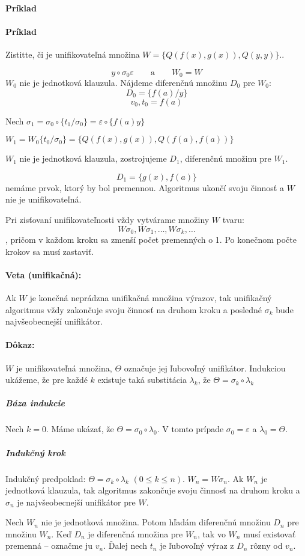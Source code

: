 \paragraph{Príklad}

\paragraph{Príklad} Zistitte, či je unifikovateľná množina $W=\{Q(f(x),g(x)),
Q(y,y)\}..$


	$$y\circ \sigma_0 \varepsilon \qquad \mbox{a} \qquad W_0 = W$$
$W_0$ nie je jednotková klauzula. Nájdeme diferenčnú množinu $D_0$ pre $W_0$:
$$D_0 = \{ f(a)/y \}$$
$$v_0, t_0 = f(a)$$

Nech $\sigma_1 = \sigma_0 \circ \{ t_1/\sigma_0\} = \varepsilon \circ  \{
f(a)y\}$

$W_1 = W_0 \{ t_0/\sigma_0\} = \{ Q(f(x),g(x)), Q(f(a),f(a))\}$

$W_1$ nie je jednotková klauzula, zostrojujeme $D_1$, diferenčnú množinu
pre $W_1$.


$$D_1 = \{ g(x), f(a)\}$$ nemáme prvok, ktorý by bol premennou. Algoritmus
ukončí svoju činnosť a $W$ nie je unifikovateľná.

\par Pri zisťovaní unifikovateľnosti vždy vytvárame množiny $W$ tvaru:
$$W\sigma_0, W\sigma_1, \ldots, W\sigma_k, \ldots$$, pričom v každom kroku sa
zmenší počet premenných o 1. Po konečnom počte krokov sa musí zastaviť.


\paragraph{Veta (unifikačná):} Ak $W$ je konečná neprádzna unifikačná množina
výrazov, tak unifikačný algoritmus vždy zakončuje svoju činnosť na druhom kroku
a posledné $\sigma_k$ bude najvšeobecnejší unifikátor.

\paragraph{Dôkaz:} $W$ je unifikovateľná množina, $\Theta$ označuje jej
ľubovoľný unifikátor. Indukciou ukážeme, že pre každé $k$ existuje taká
substitácia $\lambda_k$, že $\Theta = \sigma_k \circ \lambda_k$

\subparagraph{Báza indukcie} Nech $k = 0$. Máme ukázať, že $\Theta = \sigma_0
\circ \lambda_0$. V tomto prípade $\sigma_0 = \varepsilon$ a $\lambda_0 =
\Theta$.

\subparagraph{Indukčný krok} Indukčný predpoklad: $\Theta = \sigma_k \circ
\lambda_k$ $(0 \leq k \leq n)$. $W_n = W\sigma_n$. Ak $W_n$ je jednotková
klauzula, tak algoritmus zakončuje svoju činnosť na druhom kroku a $\sigma_n$ je
najvšeobecnejší unifikátor pre $W$. 
\par Nech $W_n$ nie je jednotková množina. Potom hľadám diferenčnú množinu $D_n
$ pre množinu $W_n$. Keď $D_n$ je diferenčná množina pre $W_n$, tak vo $W_n$
musí existovať premenná -- označme ju $v_n$. Ďalej nech $t_n$ je ľubovoľný výraz
z $D_n$ rôzny od $v_n$.

